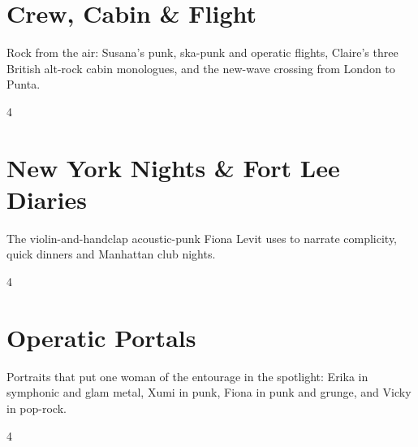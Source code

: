 \documentclass[a4paper,landscape]{memoir}
\begin{document}
\chapter{Crew, Cabin \& Flight}
Rock from the air: Susana’s punk, ska-punk and operatic flights, Claire’s three British alt-rock cabin monologues, and the new-wave crossing from London to Punta.
\clearpage\begin{multicols*}{4}
\end{multicols*}

\chapter{New York Nights \& Fort Lee Diaries}
The violin-and-handclap acoustic-punk Fiona Levit uses to narrate complicity, quick dinners and Manhattan club nights.
\clearpage\begin{multicols*}{4}
\end{multicols*}

\chapter{Operatic Portals}
Portraits that put one woman of the entourage in the spotlight: Erika in symphonic and glam metal, Xumi in punk, Fiona in punk and grunge, and Vicky in pop-rock.
\clearpage\begin{multicols*}{4}
\end{multicols*}
\end{document}
